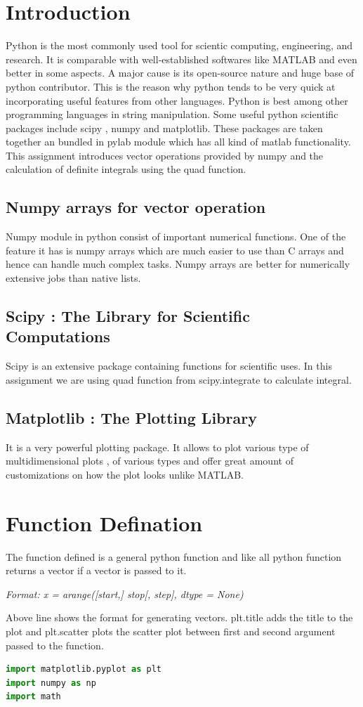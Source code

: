\documentclass[letterpaper, 12pt]{article}
\begin{document}
\begin{multicols}{2}
\section{Introduction}
Python is the most commonly used tool for scientic computing, engineering, and research.
It is comparable with well-established softwares like MATLAB and even better in some aspects. A major cause is its open-source nature and huge base of python contributor. This is the reason why python tends to be very quick at incorporating
useful features from other languages.
Python is best among other programming languages in string manipulation. 
Some useful python scientific packages include scipy , numpy and matplotlib. These packages are taken together an bundled in pylab module which has all kind of matlab functionality.
This assignment introduces vector operations provided by
numpy and the calculation of definite integrals using the quad function.
\subsection{Numpy arrays for vector operation}
Numpy module in python consist of important numerical functions. One of the feature it has is numpy arrays which are much easier to use than C arrays and hence can handle much complex tasks. Numpy arrays are better for numerically extensive jobs than native lists.
\subsection{Scipy : The Library for Scientific Computations}
Scipy is an extensive package containing functions for scientific uses. In this assignment we are using quad function from scipy.integrate to calculate integral. 
\subsection{Matplotlib : The Plotting Library}
It is a very powerful plotting package. It allows to plot various type of multidimensional plots , of various types and offer great amount of customizations on how the plot looks unlike MATLAB. 
\section{Function Defination}
The function defined is a general python function and like all python function returns a vector if a vector is passed to it.
\vspace{6mm}
\begin{footnotesize}
\textit{Format: x = arange([start,] stop[, step], dtype = None)}
\end{footnotesize}
Above line shows the format for generating vectors.
plt.title adds the title to the plot and plt.scatter plots the scatter plot between first and second argument passed to the function.
\begin{lstlisting}[language=Python ,caption=To generate and plot $1/(1+t^{2})$]
import matplotlib.pyplot as plt
import numpy as np
import math


\end{lstlisting}
\end{multicols}
\end{document}
